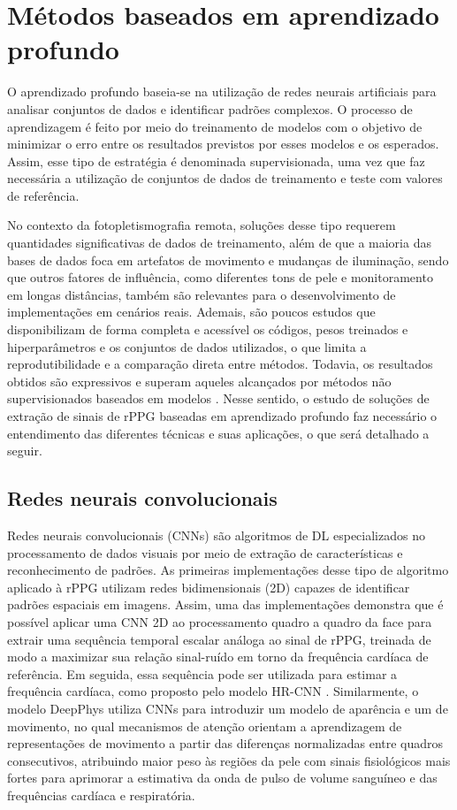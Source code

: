\section{Métodos baseados em aprendizado profundo}

O aprendizado profundo baseia-se na utilização de redes neurais artificiais para analisar conjuntos de dados e identificar padrões complexos. O processo de aprendizagem é feito por meio do treinamento de modelos com o objetivo de minimizar o erro entre os resultados previstos por esses modelos e os esperados. Assim, esse tipo de estratégia é denominada supervisionada, uma vez que faz necessária a utilização de conjuntos de dados de treinamento e teste com valores de referência. 

No contexto da fotopletismografia remota, soluções desse tipo requerem quantidades significativas de dados de treinamento, além de que a maioria das bases de dados foca em artefatos de movimento e mudanças de iluminação, sendo que outros fatores de influência, como diferentes tons de pele e monitoramento em longas distâncias, também são relevantes para o desenvolvimento de implementações em cenários reais. Ademais, são poucos estudos que disponibilizam de forma completa e acessível os códigos, pesos treinados e hiperparâmetros e os conjuntos de dados utilizados, o que limita a reprodutibilidade e a comparação direta entre métodos. Todavia, os resultados obtidos são expressivos e superam aqueles alcançados por métodos não supervisionados baseados em modelos \cite{cheng2021deep, xiao2024remote, chen2024deep}. Nesse sentido, o estudo de soluções de extração de sinais de rPPG baseadas em aprendizado profundo faz necessário o entendimento das diferentes técnicas e suas aplicações, o que será detalhado a seguir.

\subsection{Redes neurais convolucionais}

Redes neurais convolucionais (CNNs) são algoritmos de DL especializados no processamento de dados visuais por meio de extração de características e reconhecimento de padrões. As primeiras implementações desse tipo de algoritmo aplicado à rPPG utilizam redes bidimensionais (2D) capazes de identificar padrões espaciais em imagens. Assim, uma das implementações demonstra que é possível aplicar uma CNN 2D ao processamento quadro a quadro da face para extrair uma sequência temporal escalar análoga ao sinal de rPPG, treinada de modo a maximizar sua relação sinal-ruído em torno da frequência cardíaca de referência. Em seguida, essa sequência pode ser utilizada para estimar a frequência cardíaca, como proposto pelo modelo HR-CNN \cite{vspetlik2018visual}. Similarmente, o modelo DeepPhys \cite{chen2018deepphys} utiliza CNNs para introduzir um modelo de aparência e um de movimento, no qual mecanismos de atenção orientam a aprendizagem de representações de movimento a partir das diferenças normalizadas entre quadros consecutivos, atribuindo maior peso às regiões da pele com sinais fisiológicos mais fortes para aprimorar a estimativa da onda de pulso de volume sanguíneo e das frequências cardíaca e respiratória. 

